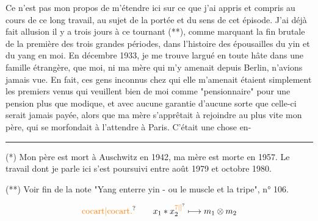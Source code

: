 Ce n'est pas mon propos de m'étendre ici sur ce que j'ai appris et compris au cours de ce long travail, au sujet de la portée et du sens de cet épisode. J'ai déjà fait allusion il y a trois jours à ce tournant (**), comme marquant la fin brutale de la première des trois grandes périodes, dans l'histoire des épousailles du yin et du yang en moi. En décembre 1933, je me trouve largué en toute hâte dans une famille étrangère, que moi, ni ma mère qui m'y amenait depuis Berlin, n'avions jamais vue. En fait, ces gens inconnus chez qui elle m'amenait étaient simplement les premiers venus qui veuillent bien de moi comme "pensionnaire" pour une pension plus que modique, et avec aucune garantie d'aucune sorte que celle-ci serait jamais payée, alors que ma mère s'apprêtait à rejoindre au plus vite mon père, qui se morfondait à l'attendre à Paris. C'était une chose en-

\noindent\rule{5em}{0.4pt}\par
(*) Mon père est mort à Auschwitz en 1942, ma mère est morte en 1957. Le travail dont je parle ici s'est poursuivi entre août 1979 et octobre 1980.

(**) Voir fin de la note "Yang enterre yin - ou le muscle et la tripe", n° 106.




\[
\text{\unsure{cocart|cocart.}}\qquad x_1\ast x_2^{\unsure{7|]}}\longmapsto m_1\otimes m_2
\]


